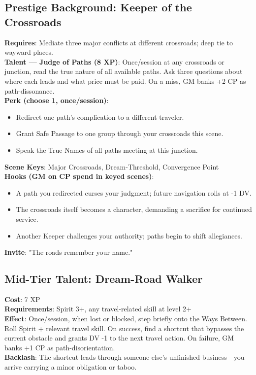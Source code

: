 \subsection*{Prestige Background: Keeper of the Crossroads}
\textbf{Requires}: Mediate three major conflicts at different crossroads; deep tie to wayward places. \\
\textbf{Talent --- Judge of Paths (8 XP)}: Once/session at any crossroads or junction, read the true nature of all available paths. Ask three questions about where each leads and what price must be paid. On a miss, GM banks +2 CP as path-dissonance. \\
\textbf{Perk (choose 1, once/session)}:
\begin{itemize}
    \item Redirect one path's complication to a different traveler.
    \item Grant Safe Passage to one group through your crossroads this scene.
    \item Speak the True Names of all paths meeting at this junction.
\end{itemize}
\textbf{Scene Keys}: Major Crossroads, Dream-Threshold, Convergence Point \\
\textbf{Hooks (GM on CP spend in keyed scenes)}:
\begin{itemize}
    \item A path you redirected curses your judgment; future navigation rolls at -1 DV.
    \item The crossroads itself becomes a character, demanding a sacrifice for continued service.
    \item Another Keeper challenges your authority; paths begin to shift allegiances.
\end{itemize}
\textbf{Invite}: "The roads remember your name."

\subsection*{Mid-Tier Talent: Dream-Road Walker}
\textbf{Cost}: 7 XP \\
\textbf{Requirements}: Spirit 3+, any travel-related skill at level 2+ \\
\textbf{Effect}: Once/session, when lost or blocked, step briefly onto the Ways Between. Roll Spirit + relevant travel skill. On success, find a shortcut that bypasses the current obstacle and grants DV -1 to the next travel action. On failure, GM banks +1 CP as path-disorientation. \\
\textbf{Backlash}: The shortcut leads through someone else's unfinished business---you arrive carrying a minor obligation or taboo.

